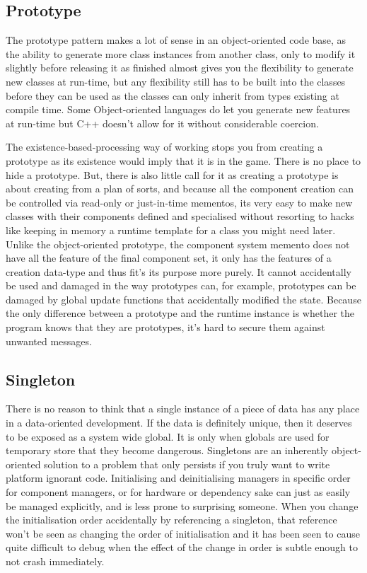\subsection{Prototype}

The prototype pattern makes a lot of sense in an object-oriented code base, as
the ability to generate more class instances from another class, only to modify
it slightly before releasing it as finished almost gives you the flexibility to
generate new classes at run-time, but any flexibility still has to be built
into the classes before they can be used as the classes can only inherit from
types existing at compile time. Some Object-oriented languages do let you
generate new features at run-time but C++ doesn't allow for it without
considerable coercion.

The existence-based-processing way of working stops you from creating a
prototype as its existence would imply that it is in the game. There is no
place to hide a prototype. But, there is also little call for it as creating a
prototype is about creating from a plan of sorts, and because all the component
creation can be controlled via read-only or just-in-time mementos, its very
easy to make new classes with their components defined and specialised without
resorting to hacks like keeping in memory a runtime template for a class you
might need later. Unlike the object-oriented prototype, the component system
memento does not have all the feature of the final component set, it only has
the features of a creation data-type and thus fit's its purpose more purely. It
cannot accidentally be used and damaged in the way prototypes can, for example,
prototypes can be damaged by global update functions that accidentally modified
the state. Because the only difference between a prototype and the runtime
instance is whether the program knows that they are prototypes, it's hard to
secure them against unwanted messages.

\subsection{Singleton}

There is no reason to think that a single instance of a piece of data has any
place in a data-oriented development. If the data is definitely unique, then it
deserves to be exposed as a system wide global. It is only when globals are
used for temporary store that they become dangerous. Singletons are an
inherently object-oriented solution to a problem that only persists if you
truly want to write platform ignorant code. Initialising and deinitialising
managers in specific order for component managers, or for hardware or
dependency sake can just as easily be managed explicitly, and is less prone to
surprising someone. When you change the initialisation order accidentally by
referencing a singleton, that reference won't be seen as changing the order of
initialisation and it has been seen to cause quite difficult to debug when the
effect of the change in order is subtle enough to not crash immediately.

